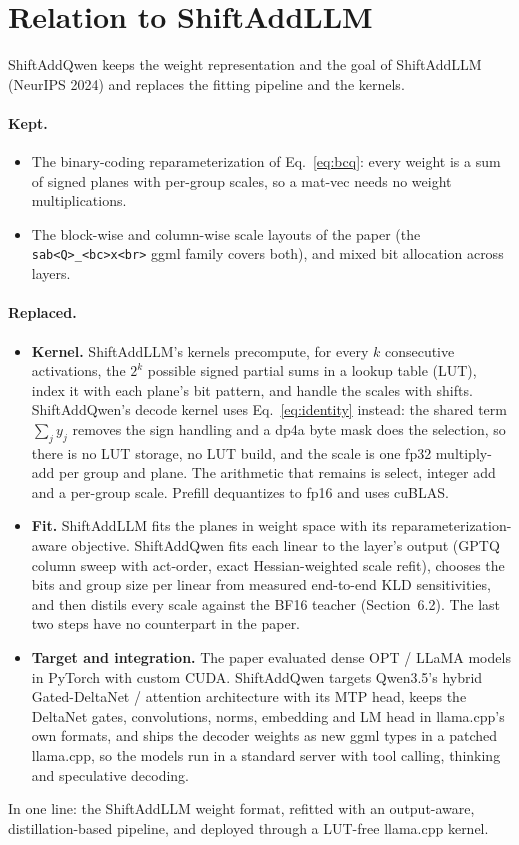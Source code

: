 \documentclass[11pt]{article}
\begin{document}
\section{Relation to ShiftAddLLM}
ShiftAddQwen keeps the weight representation and the goal of ShiftAddLLM (NeurIPS 2024) and replaces the fitting
pipeline and the kernels.

\paragraph{Kept.}
\begin{itemize}
\item The binary-coding reparameterization of Eq.~\eqref{eq:bcq}: every weight is a sum of signed planes with
  per-group scales, so a mat-vec needs no weight multiplications.
\item The block-wise and column-wise scale layouts of the paper (the \texttt{sab<Q>\_<bc>x<br>} ggml family covers both),
  and mixed bit allocation across layers.
\end{itemize}

\paragraph{Replaced.}
\begin{itemize}
\item \textbf{Kernel.} ShiftAddLLM's kernels precompute, for every $k$ consecutive activations, the $2^k$ possible signed
  partial sums in a lookup table (LUT), index it with each plane's bit pattern, and handle the scales with shifts.
  ShiftAddQwen's decode kernel uses Eq.~\eqref{eq:identity} instead: the shared term $\sum_j y_j$ removes the sign
  handling and a dp4a byte mask does the selection, so there is no LUT storage, no LUT build, and the scale is one
  fp32 multiply-add per group and plane. The arithmetic that remains is select, integer add and a per-group scale.
  Prefill dequantizes to fp16 and uses cuBLAS.
\item \textbf{Fit.} ShiftAddLLM fits the planes in weight space with its reparameterization-aware objective.
  ShiftAddQwen fits each linear to the layer's output (GPTQ column sweep with act-order, exact Hessian-weighted scale
  refit), chooses the bits and group size per linear from measured end-to-end KLD sensitivities, and then distils every
  scale against the BF16 teacher (Section~6.2). The last two steps have no counterpart in the paper.
\item \textbf{Target and integration.} The paper evaluated dense OPT / LLaMA models in PyTorch with custom CUDA.
  ShiftAddQwen targets Qwen3.5's hybrid Gated-DeltaNet / attention architecture with its MTP head, keeps the DeltaNet
  gates, convolutions, norms, embedding and LM head in llama.cpp's own formats, and ships the decoder weights as new
  ggml types in a patched llama.cpp, so the models run in a standard server with tool calling, thinking and
  speculative decoding.
\end{itemize}
In one line: the ShiftAddLLM weight format, refitted with an output-aware, distillation-based pipeline, and deployed
through a LUT-free llama.cpp kernel.
\end{document}
